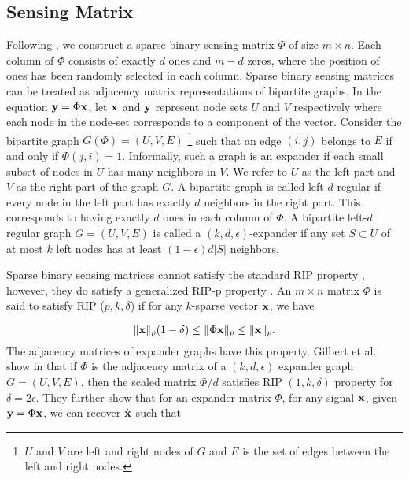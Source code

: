 \subsection{Sensing Matrix}
Following \cite{mamaghanian2011compressed},
we construct a sparse binary sensing matrix $\Phi$ of size
$m \times n$.
Each column of $\Phi$ consists of exactly $d$ ones and
$m-d$ zeros, where the position of ones has been randomly
selected in each column.
Sparse binary sensing matrices can be treated as adjacency 
matrix representations of bipartite graphs.
In the equation $\mathbf{y} = \Phi \mathbf{x}$, let $\mathbf{x}$
and $\mathbf{y}$ represent node sets $U$ and $V$
respectively where each node in the node-set
corresponds to a component of the vector.
Consider the bipartite graph $G (\Phi) = (U, V, E)$
\footnote{$U$ and $V$ are left and right nodes of $G$
and $E$ is the set of edges between the left and right nodes.}
such that
an edge $(i, j)$ belongs to $E$ if and only if
$\Phi(j, i) = 1$. Informally, such a graph is
an expander \cite{gilbert2010sparse}
if each small subset of nodes in $U$ has many neighbors
in $V$. We refer to $U$ as the left part and $V$
as the right part of the graph $G$.
A bipartite graph is called left $d$-regular
if every node in the left part has exactly
$d$ neighbors in the right part. This corresponds to having
exactly $d$ ones in each column of $\Phi$.
A bipartite left-$d$ regular graph $G = (U, V, E)$
is called a $(k, d, \epsilon)$-expander if any
set $S \subset U$ of at most $k$ left nodes has
at least $(1-\epsilon)d|S|$ neighbors.

Sparse binary sensing matrices cannot satisfy the standard RIP
property \cite{candes2008restricted},
however, they do satisfy a generalized
RIP-p property \cite{berinde2008combining,gilbert2010sparse}.
An $m \times n$ matrix $\Phi$ is said to satisfy
RIP ($p, k, \delta$) if for any $k$-sparse vector
$\mathbf{x}$, we have

\begin{equation}
\| \mathbf{x} \|_p (1 - \delta) \leq \| \Phi \mathbf{x} \|_p \leq \| \mathbf{x} \|_p.
\end{equation}
The adjacency matrices of expander graphs have
this property. Gilbert et al. show in \cite{gilbert2010sparse}
that if $\Phi$ is the adjacency matrix of a $(k,d, \epsilon)$
expander graph $G = (U, V, E)$, then the scaled matrix
$\Phi / d$ satisfies RIP $(1,k, \delta)$ property for
$\delta = 2 \epsilon$.
They further show that for an expander matrix $\Phi$,
for any signal $\mathbf{x}$, given $\mathbf{y} = \Phi \mathbf{x}$, we
can recover $\hat{\mathbf{x}}$ such that

